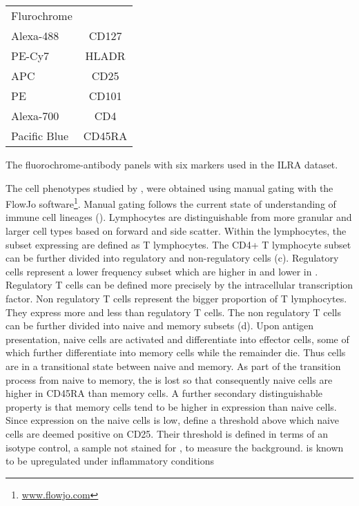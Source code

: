 \begin{table}[h]
\centering
\begin{tabular}{lc}
\rowcolor{Gray}
Flurochrome  & \\
Alexa-488    & CD127\\
PE-Cy7       & HLADR\\
APC          & CD25\\
PE           & CD101\\
Alexa-700    & CD4\\
Pacific Blue & CD45RA\\
\end{tabular}
{ The fluorochrome-antibody panels with six markers used in the ILRA dataset.  }
{
}
\end{table}


The cell phenotypes studied by \citet{Dendrou:2009dv}, were obtained using manual gating with the FlowJo software\footnote{\url{www.flowjo.com}}.
Manual gating follows the current state of understanding of immune cell lineages ().
Lymphocytes are distinguishable from more granular and larger cell types based on forward and side scatter.
Within the lymphocytes, the subset expressing  are defined as T lymphocytes.
The CD4+ T lymphocyte subset can be further divided into regulatory and non-regulatory cells (c).
Regulatory cells represent a lower frequency subset which are higher in  and lower in .
Regulatory T cells can be defined more precisely by the intracellular  transcription factor.
Non regulatory T cells represent the bigger proportion of T lymphocytes.
They express more  and less  than regulatory T cells.
The non regulatory T cells can be further divided into naive and memory subsets (d).  
Upon antigen presentation, naive cells are activated and differentiate into effector cells, some of which further differentiate into memory cells
while the remainder die.
Thus cells are in a transitional state between naive and memory.  
As part of the transition process from naive to memory, the  is lost so that consequently naive cells are higher in CD45RA than memory cells.
A further secondary distinguishable property is that memory cells tend to be higher in  expression than naive cells.
Since  expression on the naive cells is low, \citet{Dendrou:2009dv} define a threshold above which naive cells are deemed positive on CD25.
Their threshold is defined in terms of an isotype control, a sample not stained for , to measure the background.
 is known to be upregulated under inflammatory conditions

